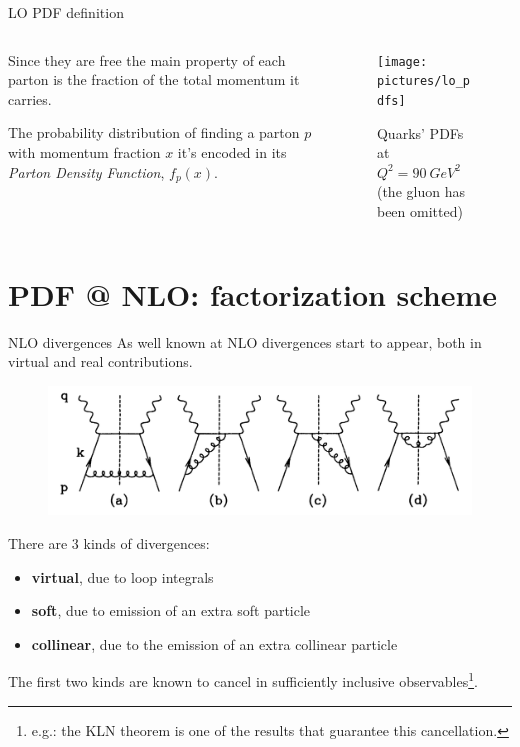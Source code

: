 \documentclass[9pt]{beamer}
\begin{document}
\begin{frame}{LO PDF definition}
    \begin{columns}
        \begin{column}{0.5\textwidth}
            Since they are free the main property of each parton is the
            fraction of the total momentum it carries.\newline

            The probability distribution of finding a parton $p$ with momentum
            fraction $x$ it's encoded in its \textit{Parton Density Function}\footnotemark,
            $f_p(x)$.
        \end{column}
        \begin{column}{0.5\textwidth}
            \begin{figure}
                \centering
                \texttt{[image: pictures/lo\_pdfs]}
                \caption{Quarks' PDFs at $Q^2 = \SI{90}{GeV^2}$ (the gluon
                has been omitted)}
            \end{figure}
            \vspace*{-20pt}
        \end{column}
    \end{columns}
\end{frame}

\section{PDF @ NLO: factorization scheme}
\begin{frame}{NLO divergences}
    As well known at NLO divergences start to appear, both in virtual and real contributions.
    \begin{figure}
        \centering
        \includegraphics[width=.8\textwidth]{pictures/nlo-real}
    \end{figure}
    There are 3 kinds of divergences:
    \begin{itemize}
        \item \textbf{virtual}, due to loop integrals
        \item \textbf{soft}, due to emission of an extra soft particle
        \item \textbf{collinear}, due to the emission of an extra collinear particle
    \end{itemize}
    The first two kinds are known to cancel in sufficiently inclusive
    observables\footnote{e.g.: the KLN theorem is one of the results that guarantee
    this cancellation.}.
\end{frame}
\end{document}
